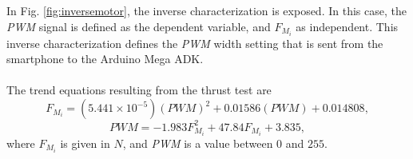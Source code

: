 In Fig. \ref{fig:inversemotor}, the inverse characterization is exposed. In this case, the \textit{PWM} signal is defined as the dependent variable, and $F_{M_i}$ as independent. This inverse characterization defines the \textit{PWM} width setting that is sent from the smartphone to the Arduino Mega ADK.
\\\\
The trend equations resulting from the thrust test are
\begin{equation}
\label{eqn:thrustvspwm}
F_{M_i} = (5.441\times10^{-5})(PWM)^{2} + 0.01586(PWM) + 0.014808,
\end{equation}
\begin{equation}
\label{eqn:pwmvsthrust}
PWM = -1.983F_{M_i}^{2} + 47.84F_{M_i} + 3.835,
\end{equation}
where $F_{M_i}$ is given in $N$, and \textit{PWM} is a value between $0$ and $255$.
